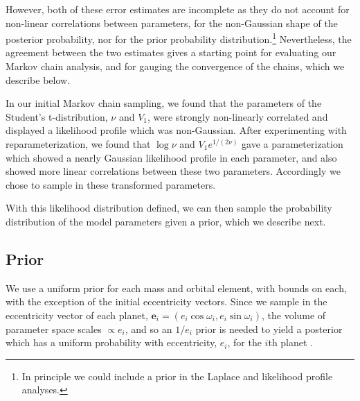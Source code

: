 \documentclass[twocolumn]{aastex63}
\begin{document}
However, both of these error estimates are incomplete as they
do not account for non-linear correlations between parameters, for the non-Gaussian shape of the posterior probability, 
nor for the prior probability distribution.\footnote{In principle we could include a prior in the Laplace and likelihood profile analyses.}
Nevertheless, the agreement between the two estimates gives
a starting point for evaluating our Markov chain analysis, and
for gauging the convergence of the chains, which we describe below.

In our initial Markov chain sampling, we found that the parameters of the Student's t-distribution, $\nu$ and $V_1$, were strongly non-linearly correlated and displayed a likelihood profile which was non-Gaussian.   After experimenting with reparameterization, we found that $\log{\nu}$ and $V_1 e^{1/(2\nu)}$ gave a parameterization which showed a nearly Gaussian likelihood profile in each parameter, and also showed more linear correlations between these two parameters.  Accordingly we chose to sample in these transformed parameters.

With this likelihood distribution
defined, we can then sample the probability distribution of
the model parameters given a prior, which we describe next.

\subsection{Prior}

We use a uniform prior for each mass and orbital element,
with bounds on each, with the exception of the initial eccentricity vectors.
Since we sample in the eccentricity vector of each planet, $\mathbf{e}_i = (e_i\cos{\omega_i},e_i\sin{\omega_i})$, the volume
of parameter space scales $\propto e_i$, and so an $1/e_i$ prior is needed to
yield a posterior which has a uniform probability with eccentricity, $e_i$,
for the $i$th planet
\citep{Eastman2013}.  
\end{document}
